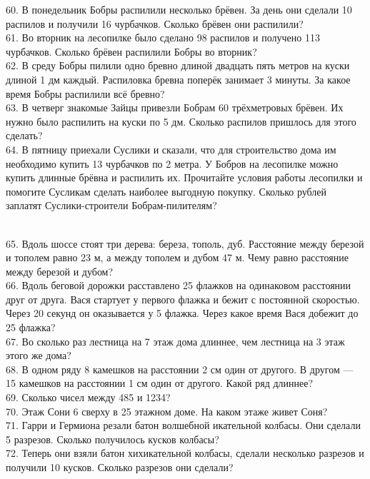 60. В понедельник Бобры распилили несколько брёвен. За день они сделали 10 распилов и получили 16 чурбачков. Сколько брёвен они распилили?\\
61. Во вторник на лесопилке было сделано 98 распилов и получено 113 чурбачков. Сколько брёвен распилили Бобры во вторник?\\
62. В среду Бобры пилили одно бревно длиной двадцать пять метров на куски длиной 1 дм каждый. Распиловка бревна поперёк занимает 3 минуты. За какое время Бобры распилили всё бревно?\\
63. В четверг знакомые Зайцы привезли Бобрам 60 трёхметровых брёвен. Их нужно было распилить на куски по 5 дм. Сколько распилов пришлось для этого сделать?\\
64. В пятницу приехали Суслики и сказали, что для строительство дома им необходимо купить 13 чурбачков по 2 метра. У Бобров на лесопилке можно купить длинные брёвна и распилить их. Прочитайте условия работы лесопилки и помогите Сусликам сделать наиболее выгодную покупку. Сколько рублей заплатят Суслики-строители Бобрам-пилителям?
\begin{figure}[h]
\end{figure}\\
65. Вдоль шоссе стоят три дерева: береза, тополь, дуб. Расстояние между березой и тополем равно 23 м, а между тополем и дубом 47 м. Чему равно расстояние между березой и дубом?\\
66. Вдоль беговой дорожки расставлено 25 флажков на одинаковом расстоянии друг от друга. Вася стартует у первого флажка и бежит с постоянной скоростью. Через 20 секунд он оказывается у 5 флажка. Через какое время Вася добежит до 25 флажка?\\
67. Во сколько раз лестница на 7 этаж дома длиннее, чем лестница на 3 этаж этого же дома?\\
68. В одном ряду 8 камешков на расстоянии 2 см один от другого. В другом --- 15 камешков на расстоянии 1 см один от другого. Какой ряд длиннее?\\
69. Сколько чисел между 485 и  1234?\\
70. Этаж Сони 6 сверху в 25 этажном доме. На каком этаже живет Соня?\\
71. Гарри и Гермиона резали батон волшебной икательной колбасы. Они сделали 5 разрезов. Сколько получилось кусков колбасы?\\
72. Теперь они взяли батон хихикательной колбасы, сделали несколько разрезов и получили 10 кусков. Сколько разрезов они сделали?\\
